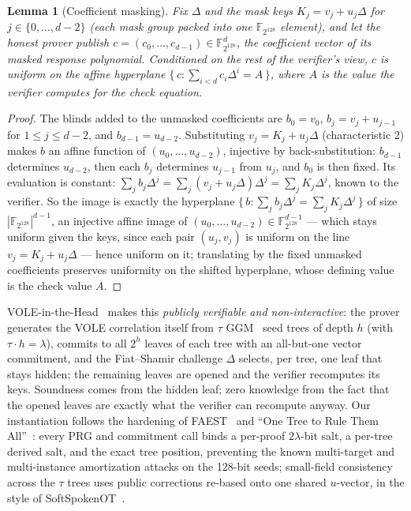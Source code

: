 \documentclass[11pt]{article}
\newtheorem{lemma}{Lemma}
\newcommand{\F}{\mathbb{F}}
\newcommand{\Ftag}{\F_{2^{128}}}
\begin{document}
\begin{lemma}[Coefficient masking]
\label{lem:mask}
Fix $\Delta$ and the mask keys $K_j = v_j + u_j\Delta$ for
$j \in \{0,\dots,d{-}2\}$ (each mask group packed into one $\Ftag$
element), and let the honest prover publish
$c = (c_0,\dots,c_{d-1}) \in \Ftag^{d}$, the coefficient vector of its
masked response polynomial. Conditioned on the rest of the verifier's
view, $c$ is uniform on the affine hyperplane
$\{\,c : \sum_{i<d} c_i \Delta^{i} = A\,\}$, where $A$ is the value the
verifier computes for the check equation.
\end{lemma}

\begin{proof}
The blinds added to the unmasked coefficients are
$b_0 = v_0$, $b_j = v_j + u_{j-1}$ for $1 \le j \le d-2$, and
$b_{d-1} = u_{d-2}$. Substituting $v_j = K_j + u_j\Delta$
(characteristic 2) makes $b$ an affine function of
$(u_0,\dots,u_{d-2})$, injective by back-substitution: $b_{d-1}$
determines $u_{d-2}$, then each $b_j$ determines $u_{j-1}$ from $u_j$,
and $b_0$ is then fixed. Its evaluation is constant:
$\sum_j b_j \Delta^{j} = \sum_j (v_j + u_j\Delta)\Delta^{j} =
\sum_j K_j \Delta^{j}$, known to the verifier. So the image is exactly
the hyperplane $\{\,b : \sum_j b_j\Delta^{j} = \sum_j K_j\Delta^{j}\,\}$
of size $|\Ftag|^{d-1}$, an injective affine image of
$(u_0,\dots,u_{d-2}) \in \Ftag^{d-1}$ --- which stays uniform given the
keys, since each pair $(u_j, v_j)$ is uniform on the line
$v_j = K_j + u_j\Delta$ --- hence uniform on it; translating
by the fixed unmasked coefficients preserves uniformity on the shifted
hyperplane, whose defining value is the check value $A$.
\end{proof}

VOLE-in-the-Head~\cite{VOLEitH} makes this \emph{publicly verifiable and
non-interactive}: the prover generates the VOLE correlation itself from
$\tau$ GGM~\cite{GGM86} seed trees of depth $h$ (with $\tau \cdot h =
\lambda$), commits to all $2^h$ leaves of each tree with an all-but-one
vector commitment, and the Fiat--Shamir challenge $\Delta$ selects, per tree,
one leaf that stays hidden; the remaining leaves are opened and the verifier
recomputes its keys. Soundness comes from the hidden leaf; zero knowledge
from the fact that the opened leaves are exactly what the verifier can
recompute anyway. Our instantiation follows the hardening of
FAEST~\cite{FAEST} and ``One Tree to Rule Them All''~\cite{OneTree}: every
PRG and commitment call binds a per-proof $2\lambda$-bit salt, a per-tree
derived salt, and the exact tree position, preventing the known multi-target
and multi-instance amortization attacks on the 128-bit seeds; small-field
consistency across the $\tau$ trees uses public corrections re-based onto
one shared $u$-vector, in the style of SoftSpokenOT~\cite{SoftSpoken}.
\end{document}

